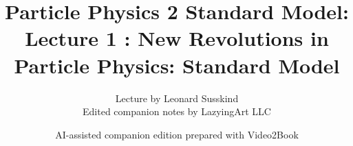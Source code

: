 \documentclass[11pt,oneside]{book}
\begin{document}
\frontmatter
\title{Particle Physics 2 Standard Model: Lecture 1 : New Revolutions in Particle Physics: Standard Model}
\author{Lecture by Leonard Susskind\\Edited companion notes by LazyingArt LLC}
\date{AI-assisted companion edition prepared with Video2Book}
\maketitle
\clearpage
\mainmatter

\end{document}
